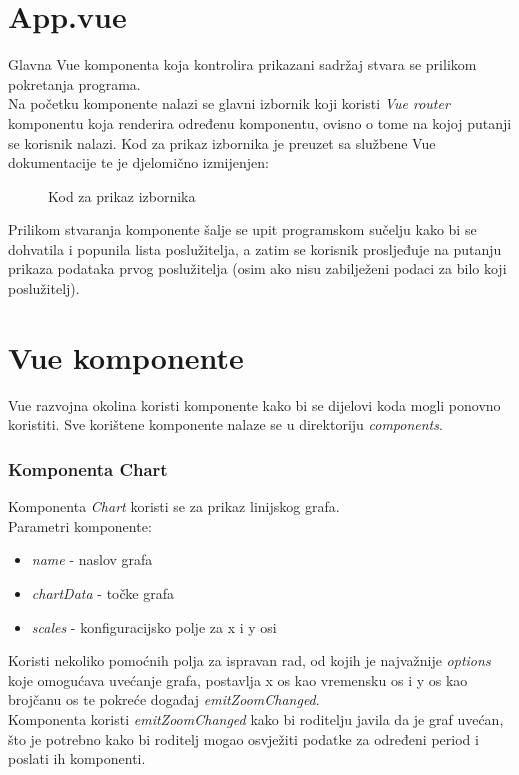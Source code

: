 \documentclass[zavrsnirad]{fer}
\begin{document}
\section{App.vue}
Glavna Vue komponenta koja kontrolira prikazani sadržaj stvara se prilikom pokretanja programa.
\\Na početku komponente nalazi se glavni izbornik koji koristi \textit{Vue router} komponentu koja renderira određenu komponentu, ovisno o tome na kojoj putanji se korisnik nalazi. Kod za prikaz izbornika je preuzet sa službene Vue dokumentacije te je djelomično izmijenjen:
\begin{figure}[htb]
	\centering
	
	\caption{Kod za prikaz izbornika}
\end{figure}
\FloatBarrier
Prilikom stvaranja komponente šalje se upit programskom sučelju kako bi se dohvatila i popunila lista poslužitelja, a zatim se korisnik prosljeđuje na putanju prikaza podataka prvog poslužitelja (osim ako nisu zabilježeni podaci za bilo koji poslužitelj).

\section{Vue komponente}
Vue razvojna okolina koristi komponente kako bi se dijelovi koda mogli ponovno koristiti. Sve korištene komponente nalaze se u direktoriju \textit{components}.

\subsubsection{Komponenta Chart}
Komponenta \textit{Chart} koristi se za prikaz linijskog grafa.
\\Parametri komponente:
\begin{itemize}
	\item \textit{name} - naslov grafa
	\item \textit{chartData} - točke grafa
	\item \textit{scales} - konfiguracijsko polje za x i y osi
\end{itemize}
Koristi nekoliko pomoćnih polja za ispravan rad, od kojih je najvažnije  \textit{options} koje omogućava uvećanje grafa, postavlja x os kao vremensku os i y os kao brojčanu os  te pokreće događaj \textit{emitZoomChanged}.
\\Komponenta koristi \textit{emitZoomChanged}  kako bi roditelju javila da je graf uvećan, što je potrebno kako bi roditelj mogao osvježiti podatke za određeni period i poslati ih komponenti.
\end{document}
